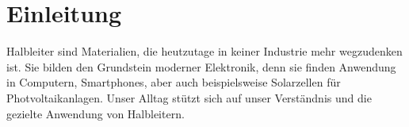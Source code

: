 \section{Einleitung}
\label{sec:einleitung}
 
 Halbleiter sind Materialien, die heutzutage in keiner Industrie mehr wegzudenken ist. Sie bilden den Grundstein moderner Elektronik, denn sie finden Anwendung in Computern, Smartphones, aber auch beispielsweise Solarzellen für Photvoltaikanlagen. Unser Alltag stützt sich auf unser Verständnis und die gezielte Anwendung von Halbleitern. 
 
 